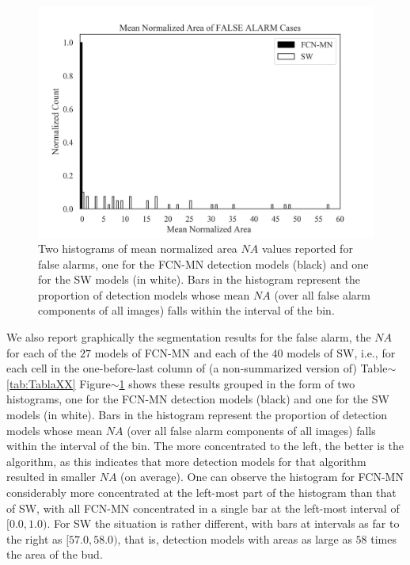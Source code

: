 \documentclass[a4paper,authoryear,review]{elsarticle}
\begin{document}
	
	
	
	
	
	
	
	
	
	
	
	\begin{figure}%
		\centering
		\includegraphics[width=\textwidth]{figures/AAA_mean_relative_area_fcn_vs_sw.png}%
		\caption{Two histograms of mean normalized area $NA$ values reported for false alarms, one for the FCN-MN detection models (black) and one for the SW models (in white). Bars in the histogram represent the proportion of detection models whose mean $NA$ (over all false alarm components of all images) falls within the interval of the bin.}
		\label{fig:AAA}
	\end{figure}
	
	We also report graphically the segmentation results for the false alarm, the $NA$  for each of the $27$ models of FCN-MN and each of the $40$ models of SW, i.e., for each cell in the  one-before-last column of (a non-summarized version of) Table$\sim$\ref{tab:TablaXX}
	Figure$\sim$\ref{fig:AAA} shows these results grouped in the form of two histograms, one for the FCN-MN detection models (black) and one for the SW models (in white). Bars in the histogram represent the proportion of detection models whose mean $NA$ (over all false alarm components of all images) falls within the interval of the bin. The more concentrated to the left, the better is the algorithm, as this indicates that more detection models for that algorithm resulted in smaller $NA$ (on average).
	One can observe the histogram for FCN-MN considerably more concentrated at the left-most part of the histogram than that of SW, with all FCN-MN concentrated in a single bar at the left-most interval of  $[0.0, 1.0)$. For SW the situation is rather different, with bars at intervals as far to the right as $[57.0, 58.0)$, that is, detection models with areas as large as $58$ times the area of the bud. 
	
\end{document}
